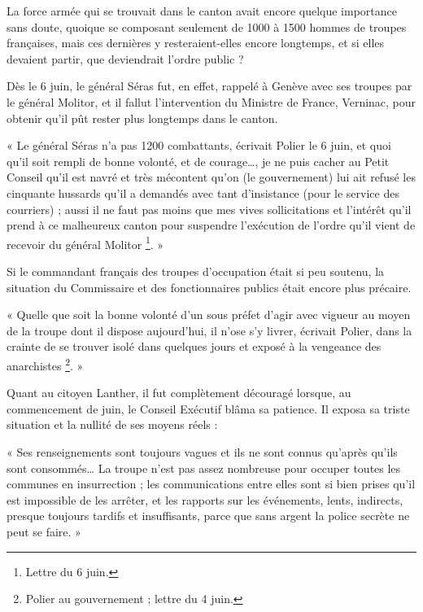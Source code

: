 \documentclass[french,twoside]{book} %
\newenvironment{quoteblock}%
  {\begin{quoting}}
  {\end{quoting}}
\newenvironment{quotebar}{%
    \def\FrameCommand{{\color{rubric!10!}\vrule width 0.5em} \hspace{0.9em}}%
    \def\OuterFrameSep{\itemsep} %
    \MakeFramed {\advance\hsize-\width \FrameRestore}
  }%
  {%
    \endMakeFramed
  }
\renewenvironment{quoteblock}%
  {%
    \savenotes
    \setstretch{0.9}
    \begin{quotebar}
  }
  {%
    \end{quotebar}
    \spewnotes
  }
\begin{document}
La force armée qui se trouvait dans le canton avait encore quelque importance sans doute, quoique se composant seulement de 1000 à 1500 hommes de troupes françaises, mais ces dernières y resteraient-elles encore longtemps, et si elles devaient partir, que deviendrait l’ordre public ?\par
Dès le 6 juin, le général Séras fut, en effet, rappelé à Genève avec ses troupes par le général Molitor, et il fallut l’intervention du Ministre de France, Verninac, pour obtenir qu’il pût rester plus longtemps dans le canton.\par

\begin{quoteblock}
 \noindent « Le général Séras n’a pas 1200 combattants, écrivait Polier le 6 juin, et quoi qu’il soit rempli de bonne volonté, et de courage…, je ne puis cacher au Petit Conseil qu’il est navré et très mécontent qu’on (le gouvernement) lui ait refusé les cinquante hussards qu’il a demandés avec tant d’insistance (pour le service des courriers) ; aussi il ne faut pas moins que mes vives sollicitations et l’intérêt qu’il prend à ce malheureux canton pour suspendre l’exécution de l’ordre qu’il vient de recevoir du général Molitor \footnote{Lettre du 6 juin.}. »
 \end{quoteblock}

\noindent Si le commandant français des troupes d’occupation était si peu soutenu, la situation du Commissaire et des fonctionnaires publics était encore plus précaire.\par

\begin{quoteblock}
 \noindent « Quelle que soit la bonne volonté d’un sous préfet d’agir avec vigueur au moyen de la troupe dont il dispose aujourd’hui, il n’ose s’y livrer, écrivait Polier, dans la crainte de se trouver isolé dans quelques jours et exposé à la vengeance des anarchistes \footnote{Polier au gouvernement ; lettre du 4 juin.}. »
 \end{quoteblock}

\noindent Quant au citoyen Lanther, il fut complètement découragé lorsque, au commencement de juin, le Conseil Exécutif blâma sa patience. Il exposa sa triste situation et la nullité de ses moyens réels :\par

\begin{quoteblock}
\noindent « Ses renseignements sont toujours vagues et ils ne sont connus qu’après qu’ils sont consommés… La troupe n’est pas assez nombreuse pour occuper toutes les communes en insurrection ; les communications entre elles sont si bien prises qu’il est impossible de les arrêter, et les rapports sur les événements, lents, indirects, presque toujours tardifs et insuffisants, parce que sans argent la police secrète ne peut se faire. »\end{quoteblock}
\end{document}
